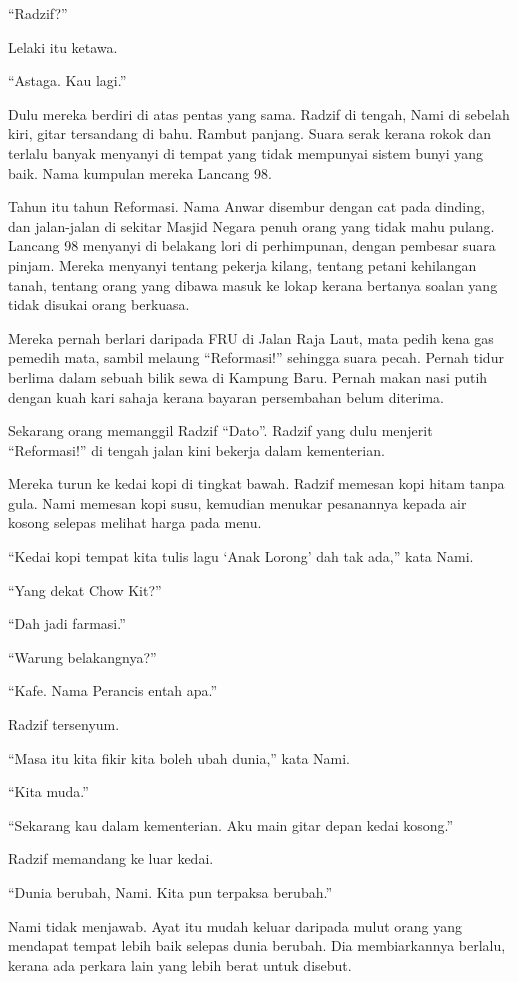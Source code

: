 \documentclass[
  11pt,
  a5paper,
  openany,
  oneside]{book}
\begin{document}
``Radzif?''

Lelaki itu ketawa.

``Astaga. Kau lagi.''

Dulu mereka berdiri di atas pentas yang sama. Radzif di tengah, Nami di
sebelah kiri, gitar tersandang di bahu. Rambut panjang. Suara serak
kerana rokok dan terlalu banyak menyanyi di tempat yang tidak mempunyai
sistem bunyi yang baik. Nama kumpulan mereka Lancang 98.

Tahun itu tahun Reformasi. Nama Anwar disembur dengan cat pada dinding,
dan jalan-jalan di sekitar Masjid Negara penuh orang yang tidak mahu
pulang. Lancang 98 menyanyi di belakang lori di perhimpunan, dengan
pembesar suara pinjam. Mereka menyanyi tentang pekerja kilang, tentang
petani kehilangan tanah, tentang orang yang dibawa masuk ke lokap kerana
bertanya soalan yang tidak disukai orang berkuasa.

Mereka pernah berlari daripada FRU di Jalan Raja Laut, mata pedih kena
gas pemedih mata, sambil melaung ``Reformasi!'' sehingga suara pecah.
Pernah tidur berlima dalam sebuah bilik sewa di Kampung Baru. Pernah
makan nasi putih dengan kuah kari sahaja kerana bayaran persembahan
belum diterima.

Sekarang orang memanggil Radzif ``Dato''. Radzif yang dulu menjerit
``Reformasi!'' di tengah jalan kini bekerja dalam kementerian.

Mereka turun ke kedai kopi di tingkat bawah. Radzif memesan kopi hitam
tanpa gula. Nami memesan kopi susu, kemudian menukar pesanannya kepada
air kosong selepas melihat harga pada menu.

``Kedai kopi tempat kita tulis lagu `Anak Lorong' dah tak ada,'' kata
Nami.

``Yang dekat Chow Kit?''

``Dah jadi farmasi.''

``Warung belakangnya?''

``Kafe. Nama Perancis entah apa.''

Radzif tersenyum.

``Masa itu kita fikir kita boleh ubah dunia,'' kata Nami.

``Kita muda.''

``Sekarang kau dalam kementerian. Aku main gitar depan kedai kosong.''

Radzif memandang ke luar kedai.

``Dunia berubah, Nami. Kita pun terpaksa berubah.''

Nami tidak menjawab. Ayat itu mudah keluar daripada mulut orang yang
mendapat tempat lebih baik selepas dunia berubah. Dia membiarkannya
berlalu, kerana ada perkara lain yang lebih berat untuk disebut.
\end{document}
